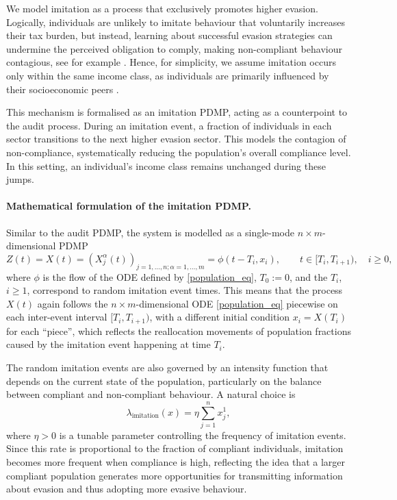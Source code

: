 \documentclass[11pt]{article}
\theoremstyle{plain}
\theoremstyle{definition}
\newcommand{\1}{\mathbf{1}}
\begin{document}
We model imitation as a process that exclusively promotes higher evasion. Logically, individuals are unlikely to imitate behaviour that voluntarily increases their tax burden, but instead, learning about successful evasion strategies can undermine the perceived obligation to comply, making non-compliant behaviour contagious, see for example \cite{bicchieri2009right}. Hence, for simplicity, we assume imitation occurs only within the same income class, as individuals are primarily influenced by their socioeconomic peers \cite{bicchieri2009right}.

This mechanism is formalised as an imitation PDMP, acting as a counterpoint to the audit process. During an imitation event, a fraction of individuals in each sector transitions to the next higher evasion sector. This models the contagion of non-compliance, systematically reducing the population's overall compliance level. In this setting, an individual's income class remains unchanged during these jumps.

\paragraph{Mathematical formulation of the imitation PDMP.}

Similar to the audit PDMP, the system is modelled as a single-mode $n \times m$-dimensional PDMP
\begin{equation*}
    Z(t)=X(t)=(X_j^\alpha(t))_{j=1,\ldots,n;\alpha=1,\ldots,m}=\phi(t-T_i,x_i), \qquad t \in [T_i,T_{i+1}), \quad i\geq 0,
\end{equation*}
where $\phi$ is the flow of the ODE defined by \eqref{population_eq}, $T_0:=0$, and the $T_i$, $i\geq 1$, correspond to random imitation event times. This means that the process $X(t)$ again follows the $n\times m$-dimensional ODE \eqref{population_eq} piecewise on each inter-event interval $[T_i,T_{i+1})$, with a different initial condition $x_i=X(T_i)$ for each ``piece'', which reflects the  reallocation movements of population fractions caused by the imitation event happening at time $T_i$. 


The random imitation events are also governed by an intensity function that depends on the current state of the population, particularly on the balance between compliant and non-compliant behaviour. A natural choice is
\begin{equation}\label{imitation_rate}
\lambda_{\text{imitation}}(x) = \eta \sum_{j=1}^{n} x_j^1,    
\end{equation}
where $\eta>0$ is a tunable parameter controlling the frequency of imitation events. Since this rate is proportional to the fraction of compliant individuals, imitation becomes more frequent when compliance is high, reflecting the idea that a larger compliant population generates more opportunities for transmitting information about evasion and thus adopting more evasive behaviour.
\end{document}
